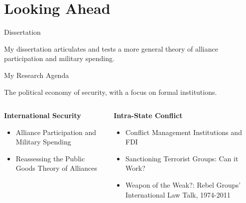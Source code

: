 \documentclass[12pt]{beamer}
\begin{document}

\section{Looking Ahead}


\begin{frame}{Dissertation}

My dissertation articulates and tests a more general theory of alliance participation and military spending. 

\end{frame}




\begin{frame}{My Research Agenda}

The political economy of security, with a focus on formal institutions. 

\begin{columns}

\begin{column}{0.5\textwidth}
\textbf{International Security}
\begin{itemize} 
\item Alliance Participation and Military Spending 
\item Reassessing the Public Goods Theory of Alliances
\end{itemize} 
\end{column}



\begin{column}{0.5\textwidth}
\textbf{Intra-State Conflict}
\begin{itemize}
\item Conflict Management Institutions and FDI
\item Sanctioning Terrorist Groups: Can it Work?
\item Weapon of the Weak?: Rebel Groups' International Law Talk, 1974-2011
\end{itemize} 
\end{column}

\end{columns}
 

\end{frame}


\end{document}
